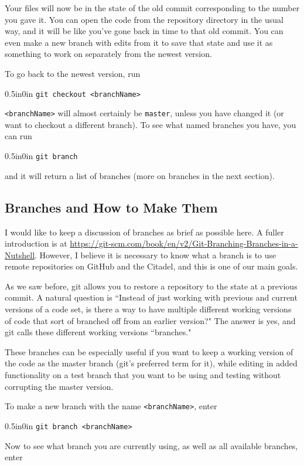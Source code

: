 \documentclass[11pt]{article}
\newcommand{\code}[1]{\begin{adjustwidth}{0.5in}{0in}
    \texttt{#1}
    \end{adjustwidth}}
\begin{document}
Your files will now be in the state of the old commit corresponding to the number you gave it.  You can open the code from the repository directory in the usual way, and it will be like you've gone back in time to that old commit.  You can even make a new branch with edits from it to save that state and use it as something to work on separately from the newest version.

To go back to the newest version, run

\code{git checkout <branchName>}

\texttt{<branchName>} will almost certainly be \texttt{master}, unless you have changed it (or want to checkout a different branch).  To see what named branches you have, you can run 

\code{git branch}

and it will return a list of branches (more on branches in the next section).
 
\subsection{Branches and How to Make Them}
\label{sec:Branches}

I would like to keep a discussion of branches as brief as possible here.  A fuller introduction is at \url{https://git-scm.com/book/en/v2/Git-Branching-Branches-in-a-Nutshell}.  However, I believe it is necessary to know what a branch is to use remote repositories on GitHub and the Citadel, and this is one of our main goals.

As we saw before, git allows you to restore a repository to the state at a previous commit.  A natural question is ``Instead of just working with previous and current versions of a code set, is there a way to have multiple different working versions of code that sort of branched off from an earlier version?"  The answer is yes, and git calls these different working versions ``branches."

These branches can be especially useful if you want to keep a working version of the code as the master branch (git's preferred term for it), while editing in added functionality on a test branch that you want to be using and testing without corrupting the master version.

To make a new branch with the name \texttt{<branchName>}, enter

\code{git branch <branchName>}

Now to see what branch you are currently using, as well as all available branches, enter
\end{document}

